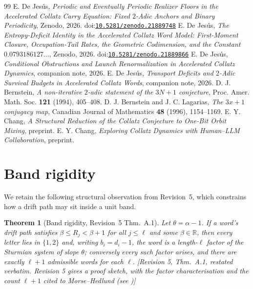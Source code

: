 \documentclass[11pt]{article}
\theoremstyle{plain}
\newtheorem{theorem}{Theorem}[section]
\theoremstyle{definition}
\theoremstyle{remark}
\newcommand{\al}{\alpha}
\newcommand{\status}[1]{\textsf{\footnotesize[#1]}}
\newcommand{\doi}[1]{\textsf{\footnotesize doi:}\href{https://doi.org/#1}{\texttt{\footnotesize #1}}}
\begin{document}
\begin{thebibliography}{99}
 E. De Jes\'us, \emph{Periodic and Eventually Periodic Realizer Floors in the
Accelerated Collatz Carry Equation: Fixed $2$-Adic Anchors and Binary Periodicity}, Zenodo, 2026.
\doi{10.5281/zenodo.21889748}
 E. De Jes\'us, \emph{The Entropy-Deficit Identity in the Accelerated Collatz
Word Model: First-Moment Closure, Occupation-Tail Rates, the Geometric Codimension, and the
Constant $0.0793186127\dots$}, Zenodo, 2026. \doi{10.5281/zenodo.21889866}
 E. De Jes\'us, \emph{Conditional Obstructions and Launch Renormalization in
Accelerated Collatz Dynamics}, companion note, 2026.
 E. De Jes\'us, \emph{Transport Deficits and $2$-Adic Survival Budgets in
Accelerated Collatz Words}, companion note, 2026.
 D. J. Bernstein, \emph{A non-iterative $2$-adic statement of the $3N+1$
conjecture}, Proc. Amer. Math. Soc. \textbf{121} (1994), 405--408.
 D. J. Bernstein and J. C. Lagarias, \emph{The $3x+1$ conjugacy map},
Canadian Journal of Mathematics \textbf{48} (1996), 1154--1169.
 E. Y. Chang, \emph{A Structural Reduction of the Collatz Conjecture to One-Bit
Orbit Mixing}, preprint.
 E. Y. Chang, \emph{Exploring Collatz Dynamics with Human--LLM Collaboration},
preprint.
\end{thebibliography}

\appendix

\section{Band rigidity}\label{sec:band}

We retain the following structural observation from Revision~5, which constrains how a drift path
may sit inside a unit band.

\begin{theorem}[Band rigidity, Revision~5 Thm.~A.1]\label{thm:band}
Let $\theta=\al-1$. If a word's drift path satisfies $\beta\le R_j<\beta+1$ for all $j\le\ell$ and
some $\beta\in\mathbb{R}$, then every letter lies in $\{1,2\}$ and, writing $b_i=d_i-1$, the word is
a length-$\ell$ factor of the Sturmian system of slope $\theta$; conversely every such factor
arises, and there are exactly $\ell+1$ admissible words for each $\ell$.
\status{Revision 5, Thm.~A.1, restated verbatim. Revision 5 gives a proof \emph{sketch}, with the
factor characterisation and the count $\ell+1$ cited to Morse--Hedlund (see \cite{Lothaire})}
\end{theorem}
\end{document}
